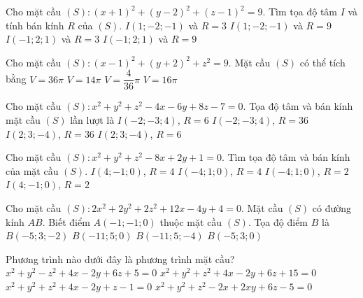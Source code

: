\begin{ex}
	Cho mặt cầu $(S)\colon (x+1)^2+(y-2)^2+(z-1)^2=9$. Tìm tọa độ tâm $I$ và tính bán kính $R$ của $(S)$.
	\choice
	{$I(1;-2;-1)$ và $R=3$}
	{$I(1;-2;-1)$ và $R=9$}
	{\True $I(-1;2;1)$ và $R=3$}
	{$I(-1;2;1)$ và $R=9$}
\end{ex}
\begin{ex}%
	Cho mặt cầu $(S)\colon (x-1)^2+(y+2)^2+z^2=9$. Mặt cầu $(S)$ có thể tích bằng
	\choice
	{\True $V=36\pi$}
	{$V=14\pi$}
	{$V=\dfrac{4}{36}\pi$}
	{$V=16\pi$}
\end{ex}
\begin{ex}
	Cho mặt cầu $(S)\colon x^2+y^2+z^2-4x-6y+8z-7=0$. Tọa độ tâm và bán kính mặt cầu $(S)$ lần lượt là
	\choice
	{$I(-2;-3;4)$, $R=6$}
	{$I(-2;-3;4)$, $R=36$}
	{$I(2;3;-4)$, $R=36$}
	{\True $I(2;3;-4)$, $R=6$}
\end{ex}
\begin{ex}
	Cho mặt cầu $(S)\colon x^2+y^2+z^2-8x+2y+1=0$. Tìm tọa độ tâm và bán kính của mặt cầu $(S)$.
	\choice
	{\True $I(4;-1;0)$, $R=4$}
	{$I(-4;1;0)$, $R=4$}
	{$I(-4;1;0)$, $R=2$}
	{$I(4;-1;0)$, $R=2$}
\end{ex}
\begin{ex} %
	Cho mặt cầu $(S)\colon 2x^2+2y^2+2z^2+12x-4y+4=0$. Mặt cầu $(S)$ có đường kính $AB$. Biết điểm $A(-1;-1;0)$ thuộc mặt cầu $(S)$. Tọa độ điểm $B$ là
	\choice
	{$B(-5;3;-2)$}
	{$B(-11;5;0)$}
	{$B(-11;5;-4)$}
	{\True$B(-5;3;0)$}
\end{ex}
\begin{ex}%
	Phương trình nào dưới đây là phương trình mặt cầu?
	\choice
	{$x^2+y^2-z^2+4x-2y+6z+5=0$}
	{$x^2+y^2+z^2+4x-2y+6z+15=0$}
	{\True $x^2+y^2+z^2+4x-2y+z-1=0$}
	{$x^2+y^2+z^2-2x+2xy+6z-5=0$}
\end{ex}
